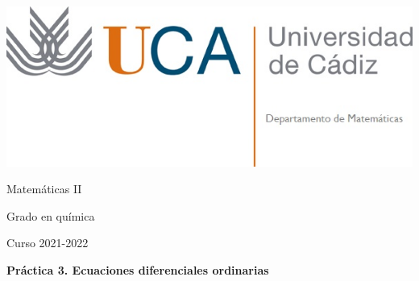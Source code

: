 \documentclass{article}
\title{}
\author{}
\date{}
\begin{document}
\begin{minipage}{.4\textwidth}
	\includegraphics[width=\linewidth]{uca.jpg}
\end{minipage}
%
\begin{minipage}{.6\textwidth}
	\begin{flushright}
		{\Large Matemáticas II}

		\medskip
		{\large Grado en química}

		\medskip
		Curso 2021-2022
	\end{flushright}
\end{minipage}

\medskip
\textbf{\Large Práctica 3. Ecuaciones diferenciales ordinarias}


\end{document}
